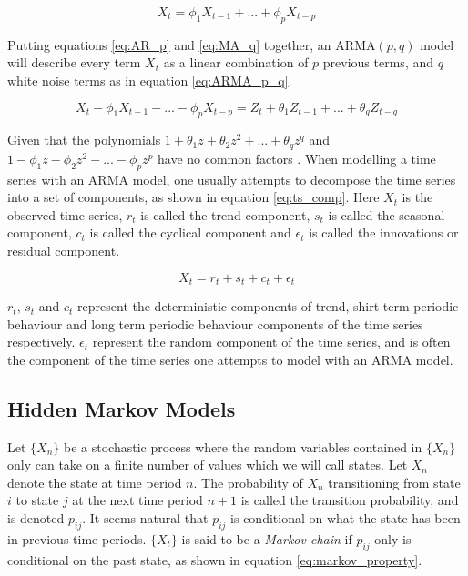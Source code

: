 \begin{equation}
    X_t = \phi_1 X_{t-1} + ... + \phi_p X_{t-p}
    \label{eq:AR_p}
\end{equation}

Putting equations \eqref{eq:AR_p} and \eqref{eq:MA_q} together, an $\mathrm{ARMA}(p,q)$ model will describe every term $X_t$ as a linear combination of $p$ previous terms, and $q$ white noise terms as in equation \eqref{eq:ARMA_p_q}.

\begin{equation}
    X_t - \phi_1 X_{t-1} - ... - \phi_p X_{t-p} = Z_{t} + \theta_1 Z_{t-1} + ... + \theta_q Z_{t-q}
    \label{eq:ARMA_p_q}
\end{equation}

Given that the polynomials $1 + \theta_1 z + \theta_2 z^2 + ... + \theta_q z^q$ and $1 - \phi_1 z - \phi_2 z^2 - ... - \phi_p z^p$ have no common factors \cite{brockwell_davis}.
When modelling a time series with an ARMA model, one usually attempts to decompose the time series into a set of components, as shown in equation \eqref{eq:ts_comp}. 
Here $X_t$ is the observed time series, 
$r_t$ is called the trend component, 
$s_t$ is called the seasonal component, 
$c_t$ is called the cyclical component 
and $\epsilon_t$ is called the innovations or residual component. 

\begin{equation}
    X_t = r_t + s_t + c_t + \epsilon_t
    \label{eq:ts_comp}
\end{equation}

$r_t$, $s_t$ and $c_t$ represent the deterministic components of trend, shirt term periodic behaviour and long term periodic behaviour components of the time series respectively. 
$\epsilon_t$ represent the random component of the time series, and is often the component of the time series one attempts to model with an ARMA model. 

\subsection{Hidden Markov Models} \label{s:hmm}
Let $\{X_n\}$ be a stochastic process where the random variables contained in $\{X_n\}$ only can take on a finite number of values which we will call states. 
Let $X_n$ denote the state at time period $n$. 
The probability of $X_n$ transitioning from state $i$ to state $j$ at the next time period $n+1$ is called the transition probability, and is denoted $p_{ij}$. 
It seems natural that $p_{ij}$ is conditional on what the state has been in previous time periods. 
$\{X_t\}$ is said to be a \textit{Markov chain} if $p_{ij}$ only is conditional on the past state, as shown in equation \eqref{eq:markov_property}.

